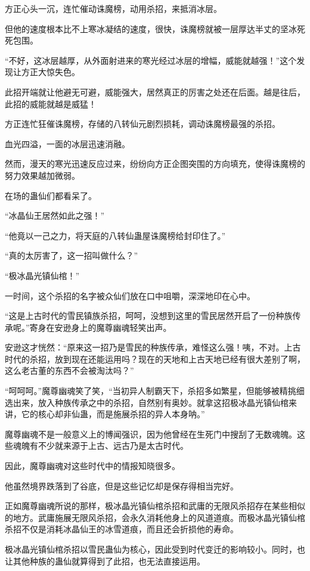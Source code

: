\begin{this_body}
方正心头一沉，连忙催动诛魔榜，动用杀招，来抵消冰层。

但他的速度根本比不上寒冰凝结的速度，很快，诛魔榜就被一层厚达半丈的坚冰死死包围。

“不好，这冰层越厚，从外面射进来的寒光经过冰层的增幅，威能就越强！”这个发现让方正大惊失色。

此招开端就让他避无可避，威能强大，居然真正的厉害之处还在后面。越是往后，此招的威能就越是威猛！

方正连忙狂催诛魔榜，存储的八转仙元剧烈损耗，调动诛魔榜最强的杀招。

血光四溢，一面的冰层迅速消融。

然而，漫天的寒光迅速反应过来，纷纷向方正企图突围的方向填充，使得诛魔榜的努力效果越加微弱。

在场的蛊仙们都看呆了。

“冰晶仙王居然如此之强！”

“他竟以一己之力，将天庭的八转仙蛊屋诛魔榜给封印住了。”

“真的太厉害了，这一招叫做什么？”

“极冰晶光镇仙棺！”

一时间，这个杀招的名字被众仙们放在口中咀嚼，深深地印在心中。

“这是上古时代的雪民镇族杀招，呵呵，没想到这里的雪民居然开启了一份种族传承呢。”寄身在安逊身上的魔尊幽魂轻笑出声。

安逊这才恍然：“原来这一招乃是雪民的种族传承，难怪这么强！咦，不对。上古时代的杀招，放到现在还能运用吗？现在的天地和上古天地已经有很大差别了啊，这么老古董的东西不会被淘汰吗？”

“呵呵呵。”魔尊幽魂笑了笑，“当初异人制霸天下，杀招多如繁星，但能够被精挑细选出来，放入种族传承之中的杀招，自然别有奥妙。就拿这招极冰晶光镇仙棺来讲，它的核心却非仙蛊，而是施展杀招的异人本身呐。”

魔尊幽魂不是一般意义上的博闻强识，因为他曾经在生死门中搜刮了无数魂魄。这些魂魄有不少就来源于上古、远古乃是太古时代。

因此，魔尊幽魂对这些时代中的情报知晓很多。

他虽然境界跌落到了谷底，但是这些记忆却是保存得相当完好。

正如魔尊幽魂所说的那样，极冰晶光镇仙棺杀招和武庸的无限风杀招存在某些相似的地方。武庸施展无限风杀招，会永久消耗他身上的风道道痕。而极冰晶光镇仙棺杀招不仅是消耗冰晶仙王的冰雪道痕，而且还会折损他的寿命。

极冰晶光镇仙棺杀招以雪民蛊仙为核心，因此受到时代变迁的影响较小。同时，也让其他种族的蛊仙就算得到了此招，也无法直接运用。


\end{this_body}
